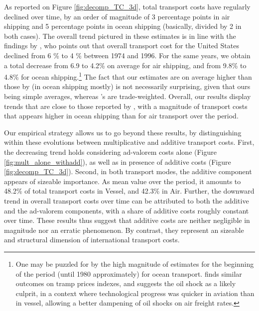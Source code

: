 \documentclass[a4paper,11pt]{article}
\begin{document}
As reported on Figure \ref{fig:decomp_TC_3d}, total transport costs have regularly declined over time, by an order of magnitude of 3 percentage points in air shipping and 5 percentage points in ocean shipping (basically, divided by 2 in both cases). The overall trend pictured in these estimates is in line with the findings by \citet{Hummels_1999}, who points out that overall transport cost for the United States declined from 6 \% to 4 \% between 1974 and 1996. For the same years, we obtain a total decrease from 6.9 to 4.2\% on average for air shipping, and from 9.8\% to 4.8\% for ocean shipping.\footnote{One may be puzzled for by the high magnitude of estimates for the beginning of the period (until 1980 approximately) for ocean transport. \citet{hummels2007} finds similar outcomes on tramp prices indexes, and suggests the oil shock as a likely culprit, in a context where technological progress was quicker in aviation than in vessel, allowing a better dampening of oil shocks on air freight rates.} The fact that our estimates are on average higher than those by \citet{Hummels_1999} (in ocean shipping mostly) is not necessarily surprising, given that ours being simple averages, whereas \citet{Hummels_1999}'s are trade-weighted. Overall, our results display trends that are close to those reported by \citet{Hummels_1999}, with a magnitude of transport costs that appears higher in ocean shipping than for air transport over the period.

Our empirical strategy allows us to go beyond these results, by distinguishing within these evolutions between multiplicative and additive transport costs. First, the decreasing trend holds considering ad-valorem costs alone (Figure \ref{fig:mult_alone_withadd}), as well as in presence of additive costs (Figure \ref{fig:decomp_TC_3d}). Second, in both transport modes, the additive component appears of sizeable importance. As mean value over the period, it amounts to 48.2\% of total transport costs in Vessel, and 42.3\% in Air. Further, the downward trend in overall transport costs over time can be attributed to both the additive and the ad-valorem components, with a share of additive costs roughly constant over time. These results thus suggest that additive costs are neither negligible in magnitude nor an erratic phenomenon. By contrast, they represent an sizeable and structural dimension of international transport costs.


\end{document}
